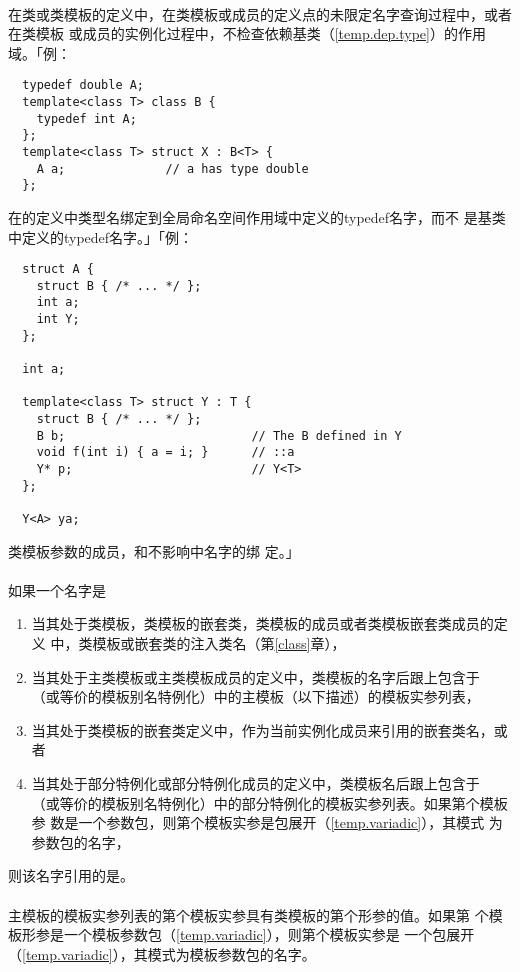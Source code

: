 \paragraph{}
在类或类模板的定义中，在类模板或成员的定义点的未限定名字查询过程中，或者在类模板
或成员的实例化过程中，不检查依赖基类（\ref{temp.dep.type}）的作用域。「例：
\begin{lstlisting}
  typedef double A;
  template<class T> class B {
    typedef int A;
  };
  template<class T> struct X : B<T> {
    A a;              // a has type double
  };
\end{lstlisting}
在的定义中类型名绑定到全局命名空间作用域中定义的typedef名字，而不
是基类中定义的typedef名字。」「例：
\begin{lstlisting}
  struct A {
    struct B { /* ... */ };
    int a;
    int Y;
  };

  int a;

  template<class T> struct Y : T {
    struct B { /* ... */ };
    B b;                          // The B defined in Y
    void f(int i) { a = i; }      // ::a
    Y* p;                         // Y<T>
  };

  Y<A> ya;
\end{lstlisting}
类模板参数的成员，和不影响中名字的绑
定。」

\paragraph{}
如果一个名字是
\begin{enumerate}
  \item{当其处于类模板，类模板的嵌套类，类模板的成员或者类模板嵌套类成员的定义
    中，类模板或嵌套类的注入类名（第\ref{class}章），}
  \item{当其处于主类模板或主类模板成员的定义中，类模板的名字后跟上包含于\tm{<>}
    （或等价的模板别名特例化）中的主模板（以下描述）的模板实参列表，}
  \item{当其处于类模板的嵌套类定义中，作为当前实例化成员来引用的嵌套类名，或者}
  \item{当其处于部分特例化或部分特例化成员的定义中，类模板名后跟上包含于\tm{<>}
    （或等价的模板别名特例化）中的部分特例化的模板实参列表。如果第个模板参
    数是一个参数包，则第个模板实参是包展开（\ref{temp.variadic}），其模式
    为参数包的名字，}
\end{enumerate}
则该名字引用的是。

\paragraph{}
主模板的模板实参列表的第个模板实参具有类模板的第个形参的值。如果第
个模板形参是一个模板参数包（\ref{temp.variadic}），则第个模板实参是
一个包展开（\ref{temp.variadic}），其模式为模板参数包的名字。

